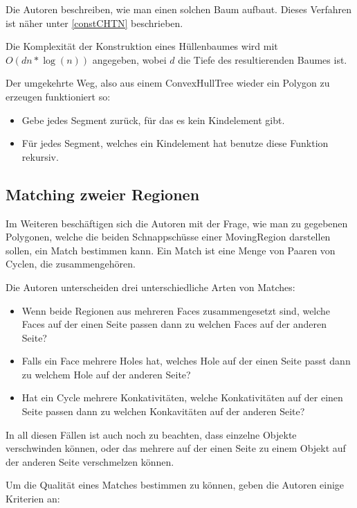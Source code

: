 Die Autoren beschreiben, wie man einen solchen Baum aufbaut. Dieses Verfahren ist näher unter \ref{constCHTN} beschrieben.

Die Komplexität der Konstruktion eines Hüllenbaumes wird mit $O(dn*\log(n))$ angegeben, wobei $d$ die Tiefe des resultierenden Baumes ist.

Der umgekehrte Weg, also aus einem ConvexHullTree wieder ein Polygon zu erzeugen funktioniert so:

\begin{itemize}
\item Gebe jedes Segment zurück, für das es kein Kindelement gibt.
\item Für jedes Segment, welches ein Kindelement hat benutze diese Funktion rekursiv.
\end{itemize}

\subsection{Matching zweier Regionen}

Im Weiteren beschäftigen sich die Autoren mit der Frage, wie man zu gegebenen Polygonen, welche die beiden Schnappschüsse einer MovingRegion darstellen sollen, ein Match bestimmen kann. Ein Match ist eine Menge von Paaren von Cyclen, die zusammengehören.

Die Autoren unterscheiden drei unterschiedliche Arten von Matches:

\begin{itemize}
\item Wenn beide Regionen aus mehreren Faces zusammengesetzt sind, welche Faces auf der einen Seite passen dann zu welchen Faces auf der anderen Seite?
\item Falls ein Face mehrere Holes hat, welches Hole auf der einen Seite passt dann zu welchem Hole auf der anderen Seite?
\item Hat ein Cycle mehrere Konkativitäten, welche Konkativitäten auf der einen Seite passen dann zu welchen Konkavitäten auf der anderen Seite?
\end{itemize}

In all diesen Fällen ist auch noch zu beachten, dass einzelne Objekte verschwinden können, oder das mehrere auf der einen Seite zu einem Objekt auf der anderen Seite verschmelzen können.

Um die Qualität eines Matches bestimmen zu können, geben die Autoren einige Kriterien an:

